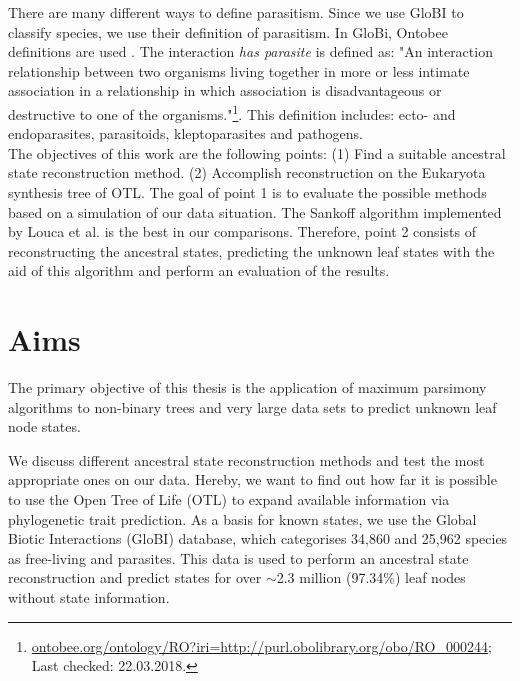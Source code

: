   There are many different ways to define parasitism. Since we use GloBI to classify species, we use 
    their definition of parasitism. In GloBi, Ontobee definitions are used \cite{Xiang2011}. The 
    interaction \textit{has parasite} is defined as: "An interaction relationship between two 
    organisms living together in more or less intimate association in a relationship in which 
    association is disadvantageous or destructive to one of the organisms."\footnote{
      \hyperlink{http://www.ontobee.org/ontology/RO?iri=http://purl.obolibrary.org/obo/RO_0002445}
      {ontobee.org/ontology/RO?iri=http://purl.obolibrary.org/obo/RO\_000244}; Last checked: 22.03.2018.
    }. This definition includes: ecto- and endoparasites, parasitoids, kleptoparasites and pathogens. \\


  The objectives of this work are the following points: (1) Find a suitable ancestral state 
    reconstruction method. (2) Accomplish reconstruction on the Eukaryota synthesis tree of OTL. The 
    goal of point 1 is to evaluate the possible methods based on a simulation of our data situation. 
    The Sankoff algorithm implemented by Louca et al. is the best in our comparisons. Therefore,
    point 2 consists of reconstructing the ancestral states, predicting the unknown leaf states with 
    the aid of this algorithm and perform an evaluation of the results.

\chapter{Aims}
  The primary objective of this thesis is the application of maximum parsimony algorithms to 
    non-binary trees and very large data sets to predict unknown leaf node states.

  We discuss different ancestral state reconstruction methods and test the most appropriate ones on 
    our data. Hereby, we want to find out how far it is possible to use the Open Tree of Life (OTL) 
    to expand available information via phylogenetic trait prediction. As a basis for known states, 
    we use the Global Biotic Interactions (GloBI) database, which categorises 34,860 and 25,962 
    species as free-living and parasites. This data is used to perform an ancestral state 
    reconstruction and predict states for over $\sim$2.3 million (97.34\%) leaf nodes without state 
    information.

